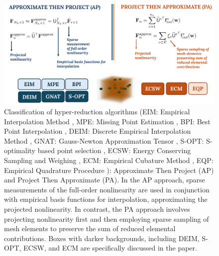 \documentclass[11pt]{article}
\begin{document}
        \begin{figure}[t]
                \centering
                \includegraphics[width=\linewidth]{ATP_PTA2.pdf}
                \caption{Classification of hyper-reduction algorithms \protect\footnotemark(EIM: Empirical Interpolation Method \cite{barrault2004empirical}, MPE: Missing Point Estimation \cite{astrid2008missing}, BPI: Best Point Interpolation \cite{nguyen2007best}, DEIM: Discrete Empirical Interpolation Method \cite{chaturantabut2010nonlinear}, GNAT: Gauss-Newton Approximation Tensor \cite{carlberg2011efficient}, S-OPT: S-optimality based point selection \cite{lauzon2024s-opt}, ECSW: Energy Conserving Sampling and Weighing \cite{farhat2014dimensional}, ECM: Empirical Cubature Method \cite{hernandez2017dimensional}, EQP: Empirical Quadrature Procedure \cite{Patera_2017_EQP}): Approximate Then Project (AP) and Project Then Approximate (PA). In the AP approach, sparse measurements of the full-order nonlinearity are used in conjunction with empirical basis functions for interpolation, approximating the projected nonlinearity. In contrast, the PA approach involves projecting nonlinearity first and then employing sparse sampling of mesh elements to preserve the sum of reduced elemental contributions. Boxes with darker backgrounds, including DEIM, S-OPT, ECSW, and ECM are specifically discussed in the paper.}
                \label{fig:hyp_algo}
        \end{figure}
\end{document}
